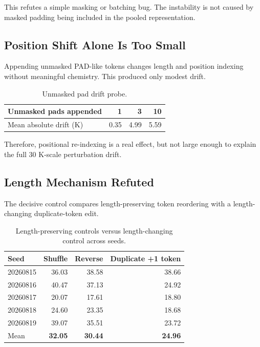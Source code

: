 \documentclass[11pt]{article}
\begin{document}
This refutes a simple masking or batching bug. The instability is not caused by
masked padding being included in the pooled representation.

\subsection{Position Shift Alone Is Too Small}

Appending unmasked PAD-like tokens changes length and position indexing without
meaningful chemistry. This produced only modest drift.

\begin{table}[H]
\centering
\caption{Unmasked pad drift probe.}
\begin{tabular}{@{}lrrr@{}}
\toprule
Unmasked pads appended & 1 & 3 & 10 \\
\midrule
Mean absolute drift (K) & 0.35 & 4.99 & 5.59 \\
\bottomrule
\end{tabular}
\end{table}

Therefore, positional re-indexing is a real effect, but not large enough to
explain the full 30 K-scale perturbation drift.

\subsection{Length Mechanism Refuted}

The decisive control compares length-preserving token reordering with a
length-changing duplicate-token edit.

\begin{table}[H]
\centering
\caption{Length-preserving controls versus length-changing control across seeds.}
\begin{tabular}{@{}lrrr@{}}
\toprule
Seed & Shuffle & Reverse & Duplicate +1 token \\
\midrule
20260815 & 36.03 & 38.58 & 38.66 \\
20260816 & 40.47 & 37.13 & 24.92 \\
20260817 & 20.07 & 17.61 & 18.80 \\
20260818 & 24.60 & 23.35 & 18.68 \\
20260819 & 39.07 & 35.51 & 23.72 \\
\midrule
Mean & \textbf{32.05} & \textbf{30.44} & \textbf{24.96} \\
\bottomrule
\end{tabular}
\end{table}
\end{document}
